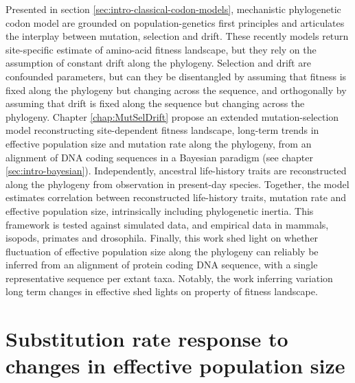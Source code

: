 Presented in section \ref{sec:intro-classical-codon-models}, mechanistic phylogenetic codon model are grounded on population-genetics first principles and articulates the interplay between mutation, selection and drift.
These recently models return site-specific estimate of amino-acid fitness landscape, but they rely on the assumption of constant drift along the phylogeny.
Selection and drift are confounded parameters, but can they be disentangled by assuming that fitness is fixed along the phylogeny but changing across the sequence, and orthogonally by assuming that drift is fixed along the sequence but changing across the phylogeny.
Chapter \ref{chap:MutSelDrift} propose an extended mutation-selection model reconstructing site-dependent fitness landscape, long-term trends in effective population size and mutation rate along the phylogeny, from an alignment of DNA coding sequences in a Bayesian paradigm (see chapter \ref{sec:intro-bayesian}).
Independently, ancestral life-history traits are reconstructed along the phylogeny from observation in present-day species.
Together, the model estimates correlation between reconstructed life-history traits, mutation rate and effective population size, intrinsically including phylogenetic inertia.
This framework is tested against simulated data, and empirical data in mammals, isopods, primates and drosophila.
Finally, this work shed light on whether fluctuation of effective population size along the phylogeny can reliably be inferred from an alignment of protein coding DNA sequence, with a single representative sequence per extant taxa.
Notably, the work inferring variation long term changes in effective shed lights on property of fitness landscape.

\section{Substitution rate response to changes in effective population size}
\label{sec-goals:GenoPhenoFit}

